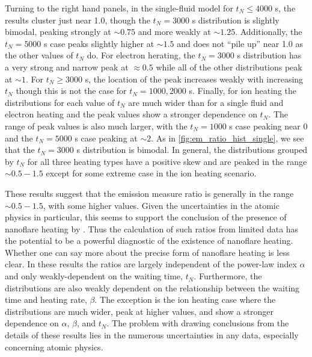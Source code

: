 \documentclass[preprint,linenumbers]{aastex}
\begin{document}
	\par Turning to the right hand panels, in the single-fluid model for $t_N\le4000$ s, the results cluster just near 1.0, though the $t_N=3000$ s distribution is slightly bimodal, peaking strongly at $\sim0.75$ and more weakly at $\sim1.25$. Additionally, the $t_N=5000$ s case peaks slightly higher at $\sim1.5$ and does not ``pile up'' near 1.0 as the other values of $t_N$ do. For electron herating, the $t_N=3000$ s distribution has a very strong and narrow peak at $\approx0.5$ while all of the other distributions peak at $\sim1$. For $t_N\ge3000$ s, the location of the peak increases weakly with increasing $t_N$ though this is not the case for $t_N=1000,2000$ s. Finally, for ion heating the distributions for each value of $t_N$ are much wider than for a single fluid and electron heating and the peak values show a stronger dependence on $t_N$. The range of peak values is also much larger, with the $t_N=1000$ s case peaking near 0 and the $t_N=5000$ s case peaking at $\sim2$. As in \autoref{fig:em_ratio_hist_single}, we see that the $t_N=3000$ s distribution is bimodal. In general, the distributions grouped by $t_N$ for all three heating types have a positive skew and are peaked in the range $\sim0.5-1.5$ except for some extreme case in the ion heating scenario.
	\par These results suggest that the emission measure ratio is generally in the range $\sim0.5-1.5$, with some higher values. Given the uncertainties in the atomic physics in particular, this seems to support the conclusion of the presence of nanoflare heating by \citet{brosius_pervasive_2014}. Thus the calculation of such ratios from limited data has the potential to be a powerful diagnostic of the existence of nanoflare heating. Whether one can say more about the precise form of nanoflare heating is less clear. In these results the ratios are largely independent of the power-law index $\alpha$ and only weakly-dependent on the waiting time, $t_N$. Furthermore, the distributions are also weakly dependent on the relationship between the waiting time and heating rate, $\beta$. The exception is the ion heating case where the distributions are much wider, peak at higher values, and show a stronger dependence on $\alpha$, $\beta$, and $t_N$. The problem with drawing conclusions from the details of these results lies in the numerous uncertainties in any data, especially concerning atomic physics.
\end{document}
